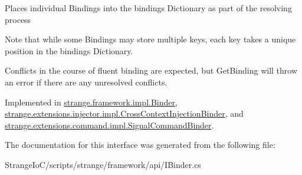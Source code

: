 Places individual Bindings into the bindings Dictionary as part of the resolving process 

Note that while some Bindings may store multiple keys, each key takes a unique position in the bindings Dictionary.

Conflicts in the course of fluent binding are expected, but Get\-Binding will throw an error if there are any unresolved conflicts. 

Implemented in \hyperlink{classstrange_1_1framework_1_1impl_1_1_binder_a59b9ca38325bf6cf4c55aa309e92d00c}{strange.\-framework.\-impl.\-Binder}, \hyperlink{classstrange_1_1extensions_1_1injector_1_1impl_1_1_cross_context_injection_binder_ad93ea865f14a6249af575633f6472a7e}{strange.\-extensions.\-injector.\-impl.\-Cross\-Context\-Injection\-Binder}, and \hyperlink{classstrange_1_1extensions_1_1command_1_1impl_1_1_signal_command_binder_a8968e1632b03d1f9223f8e66e721327f}{strange.\-extensions.\-command.\-impl.\-Signal\-Command\-Binder}.



The documentation for this interface was generated from the following file\-:\begin{DoxyCompactItemize}
\item 
Strange\-Io\-C/scripts/strange/framework/api/I\-Binder.\-cs\end{DoxyCompactItemize}
